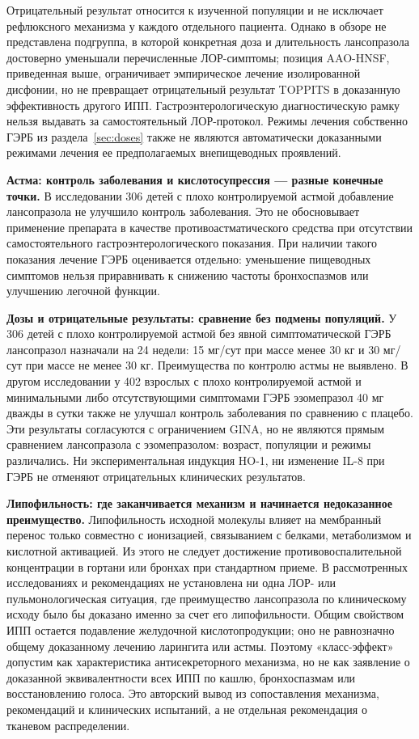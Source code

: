 \documentclass[11pt,a4paper,notitlepage]{report}
\newcommand{\src}[1]{\unskip\space\cite{#1}}
\begin{document}
Отрицательный результат относится к изученной популяции и не исключает рефлюксного механизма у каждого отдельного пациента. Однако в обзоре не представлена подгруппа, в которой конкретная доза и длительность лансопразола достоверно уменьшали перечисленные ЛОР-симптомы; позиция AAO-HNSF, приведенная выше, ограничивает эмпирическое лечение изолированной дисфонии, но не превращает отрицательный результат TOPPITS в доказанную эффективность другого ИПП. Гастроэнтерологическую диагностическую рамку нельзя выдавать за самостоятельный ЛОР-протокол. Режимы лечения собственно ГЭРБ из раздела~\ref{sec:doses} также не являются автоматически доказанными режимами лечения ее предполагаемых внепищеводных проявлений.\src{toppits,agagerd,dgvs,lyon,nice}

\textbf{Астма: контроль заболевания и кислотосупрессия --- разные конечные точки.} В исследовании 306 детей с плохо контролируемой астмой добавление лансопразола не улучшило контроль заболевания. Это не обосновывает применение препарата в качестве противоастматического средства при отсутствии самостоятельного гастроэнтерологического показания. При наличии такого показания лечение ГЭРБ оценивается отдельно: уменьшение пищеводных симптомов нельзя приравнивать к снижению частоты бронхоспазмов или улучшению легочной функции.\src{asthma}

\textbf{Дозы и отрицательные результаты: сравнение без подмены популяций.} У 306 детей с плохо контролируемой астмой без явной симптоматической ГЭРБ лансопразол назначали на 24 недели: 15 мг/сут при массе менее 30 кг и 30 мг/сут при массе не менее 30 кг. Преимущества по контролю астмы не выявлено. В другом исследовании у 402 взрослых с плохо контролируемой астмой и минимальными либо отсутствующими симптомами ГЭРБ эзомепразол 40 мг дважды в сутки также не улучшал контроль заболевания по сравнению с плацебо. Эти результаты согласуются с ограничением GINA, но не являются прямым сравнением лансопразола с эзомепразолом: возраст, популяции и режимы различались. Ни экспериментальная индукция HO-1, ни изменение IL-8 при ГЭРБ не отменяют отрицательных клинических результатов.\src{asthma,molnrf2,molil8}\src{asthmaesome2009,gina2026}

\textbf{Липофильность: где заканчивается механизм и начинается недоказанное преимущество.} Липофильность исходной молекулы влияет на мембранный перенос только совместно с ионизацией, связыванием с белками, метаболизмом и кислотной активацией. Из этого не следует достижение противовоспалительной концентрации в гортани или бронхах при стандартном приеме. В рассмотренных исследованиях и рекомендациях не установлена ни одна ЛОР- или пульмонологическая ситуация, где преимущество лансопразола по клиническому исходу было бы доказано именно за счет его липофильности. Общим свойством ИПП остается подавление желудочной кислотопродукции; оно не равнозначно общему доказанному лечению ларингита или астмы. Поэтому «класс-эффект» допустим как характеристика антисекреторного механизма, но не как заявление о доказанной эквивалентности всех ИПП по кашлю, бронхоспазмам или восстановлению голоса. Это авторский вывод из сопоставления механизма, рекомендаций и клинических испытаний, а не отдельная рекомендация о тканевом распределении.\src{molchem,pharmalabel,acggerd,aao2018,gina2026,toppits,asthma,asthmaesome2009}
\end{document}
